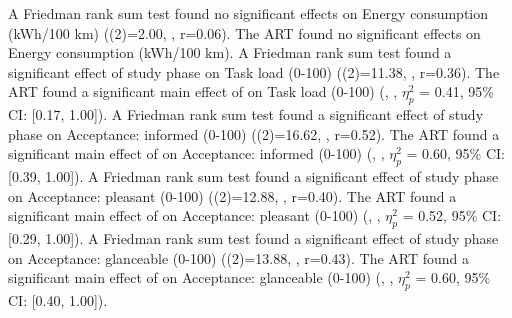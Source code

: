 A Friedman rank sum test found no significant effects on Energy consumption (kWh/100 km) (\chisq(2)=2.00, , r=0.06).
The ART found no significant effects on Energy consumption (kWh/100 km).
A Friedman rank sum test found a significant effect of study phase on Task load (0-100) (\chisq(2)=11.38, , r=0.36).
The ART found a significant main effect of \Phase on Task load (0-100) (, , $\eta_{p}^{2}$ = 0.41, 95\% CI: [0.17, 1.00]).
A Friedman rank sum test found a significant effect of study phase on Acceptance: informed (0-100) (\chisq(2)=16.62, , r=0.52).
The ART found a significant main effect of \Phase on Acceptance: informed (0-100) (, , $\eta_{p}^{2}$ = 0.60, 95\% CI: [0.39, 1.00]).
A Friedman rank sum test found a significant effect of study phase on Acceptance: pleasant (0-100) (\chisq(2)=12.88, , r=0.40).
The ART found a significant main effect of \Phase on Acceptance: pleasant (0-100) (, , $\eta_{p}^{2}$ = 0.52, 95\% CI: [0.29, 1.00]).
A Friedman rank sum test found a significant effect of study phase on Acceptance: glanceable (0-100) (\chisq(2)=13.88, , r=0.43).
The ART found a significant main effect of \Phase on Acceptance: glanceable (0-100) (, , $\eta_{p}^{2}$ = 0.60, 95\% CI: [0.40, 1.00]).
